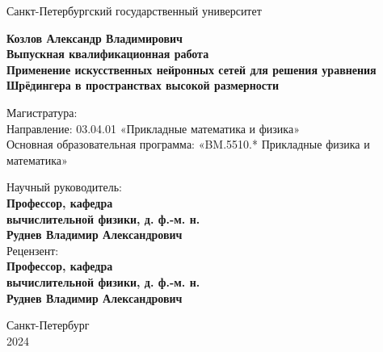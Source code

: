 \begin{titlepage}
	\vspace{0.2cm}
	\begin{center}
		{Санкт-Петербургский государственный университет}
	\end{center}
	\vspace{100pt}
	\begin{center}
		\doublespacing
  		\textbf{\large Козлов Александр Владимирович}
		\\
  		\textbf{\large Выпускная квалификационная работа}
		\\
		\textbf{\large Применение искусственных нейронных сетей для решения уравнения Шрёдингера в пространствах высокой размерности}
	\end{center}
	\vspace{1cm}
	\begin{center}
		\onehalfspacing
		Магистратура:
		\\
		Направление: 03.04.01 «Прикладные математика и физика»
		\\
		Основная образовательная программа: «BM.5510.* Прикладные физика и математика»
	\end{center}
	\vspace{60pt}
	\begin{singlespacing}
	\begin{flushright}
		Научный руководитель:\\
		\textbf{Профессор, кафедра\\ вычислительной физики, д. ф.-м. н.\\ Руднев Владимир Александрович}\\
		\vspace{12pt}
		Рецензент:\\
		\textbf{Профессор, кафедра\\ вычислительной физики, д. ф.-м. н.\\ Руднев Владимир Александрович}
	\end{flushright}
	\end{singlespacing}
	\vfill
	\begin{center}
		\singlespacing
		Санкт-Петербург\\
		2024
	\end{center}
\end{titlepage}